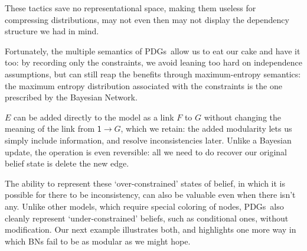 \documentclass{article}
\newcommand{\MN}{PDG}
\newcommand{\MNs}{\MN s}
\begin{document}
\begin{example}
{			These tactics save no representational space, making them useless for compressing distributions, may not even then may not display the dependency structure we had in mind. 
			
			Fortunately, the multiple semantics of \MNs\ allow us to eat our cake and have it too: by recording only the constraints, we avoid leaning too hard on independence assumptions, but can still reap the benefits through maximum-entropy semantics: the maximum entropy distribution associated with the constraints is the one prescribed by the Bayesian Network.
		}
		
		$E$ can be added directly to the model as a link $F$ to $G$ without changing the meaning of the link from $\mathsf 1 \to G$, which we retain: the added modularity lets us simply include information, and resolve inconsistencies later. Unlike a Bayesian update, the operation is even reversible: all we need to do recover our original belief state is delete the new edge.

	\end{example}			
	
%	
%		
%		
	
	The ability to represent these `over-constrained' states of belief, in which it is possible for there to be inconsistency, can also be valuable even when there isn't any. 
	Unlike other models, which require special coloring of nodes, \MNs\ also cleanly represent `under-constrained' beliefs, such as conditional ones, without modification.
	Our next example illustrates both, and highlights one more way in which BNs fail to be as modular as we might hope.
	
\end{document}
